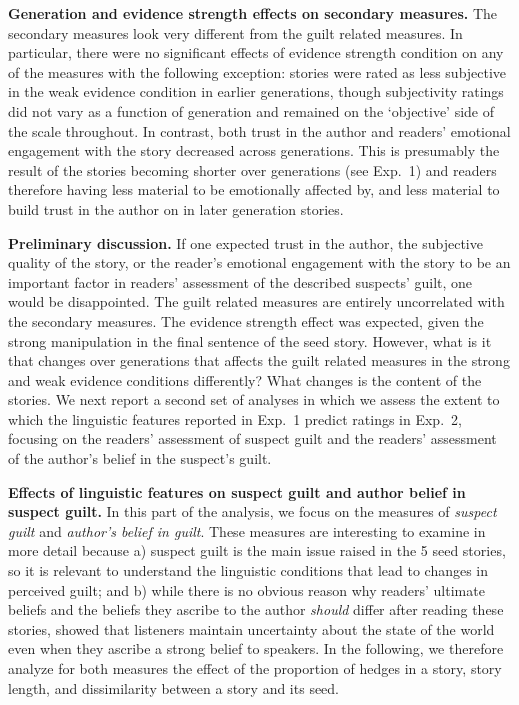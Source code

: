 \documentclass[10pt,letterpaper]{article}
\begin{document}
\textbf{Generation and evidence strength effects on secondary measures.} The secondary measures look very different from the guilt related measures. In particular, there were no significant effects of evidence strength condition on any of the measures with the following exception: stories were rated as less subjective in the weak evidence condition in earlier generations, though subjectivity ratings did not vary as a function of generation and remained on the `objective' side of the scale throughout. In contrast, both trust in the author and readers' emotional engagement with the story decreased across generations. This is presumably the result of the stories becoming shorter over generations (see Exp.~1) and readers therefore having less material to be emotionally affected by, and less material to build trust in the author on in later generation stories.

\textbf{Preliminary discussion.} If one expected trust in the author, the subjective quality of the story, or the reader's emotional engagement with the story to be an important factor in readers' assessment of the described suspects' guilt, one would be disappointed. The guilt related measures are entirely uncorrelated with the secondary measures. The evidence strength effect was expected, given the strong manipulation in the final sentence of the seed story. However, what is it that changes over generations that affects the guilt related measures in the strong and weak evidence conditions differently? What changes is the content of the stories. We next report a second set of analyses  in which we assess the extent to which the linguistic features reported in Exp.~1 predict ratings in Exp.~2, focusing on the readers' assessment of suspect guilt and the readers' assessment of the author's belief in the suspect's guilt.

\textbf{Effects of linguistic features on suspect guilt and author belief in suspect guilt.} 
 In this part of the analysis, we focus on the measures of \textit{suspect guilt} and \textit{author's belief in guilt}. These measures are interesting to examine in more detail because a) suspect guilt is the main issue raised in the 5 seed stories, so it is relevant to understand the linguistic conditions that lead to changes in perceived guilt; and b) while there is no obvious reason why readers' ultimate beliefs and the beliefs they ascribe to the author \emph{should} differ after reading these stories,  showed that listeners maintain uncertainty about the state of the world even when they ascribe a strong belief to speakers. In the following, we therefore analyze for both measures the effect of the proportion of hedges in a story, story length, and dissimilarity between a story and its seed.
\end{document}
